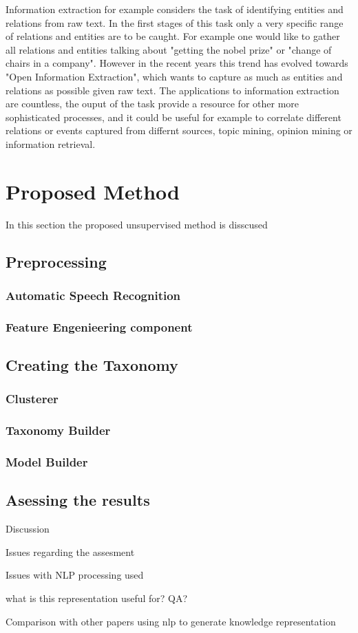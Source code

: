 \documentclass[4pt,a4paper,twocolumn]{article}
\begin{document}
Information extraction for example considers the task of identifying entities and relations from raw text.
In the first stages of this task only a very specific range of relations and entities are to be caught.
For example one would like to gather all relations and entities talking about  "getting the nobel prize" or "change of chairs in a company".
However in the recent years this trend has evolved towards "Open Information Extraction", which wants to capture as much as entities and relations as possible given raw text.
The applications to information extraction are countless, the ouput of the task provide a resource for other more sophisticated processes, and it could be useful for example to correlate different relations or events captured from differnt sources, topic mining, opinion mining or information retrieval.


\section{Proposed Method}


In this section the proposed unsupervised method is disscused

	\subsection{Preprocessing }
		\subsubsection{Automatic Speech Recognition}
		\subsubsection{Feature Engenieering component}

	\subsection{Creating the Taxonomy}
		\subsubsection{Clusterer}
		\subsubsection{Taxonomy Builder}
		\subsubsection{Model Builder}


	\subsection{Asessing the results}

	

Discussion

Issues regarding the assesment

Issues with NLP processing used

what is this representation useful for? QA?

Comparison with other papers using nlp to generate knowledge representation







{}

\end{document}
